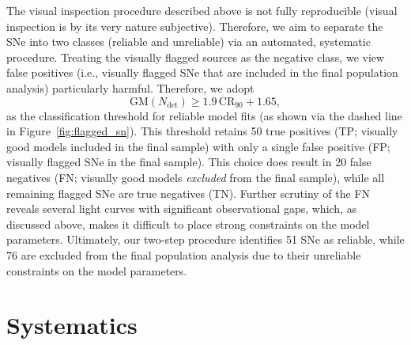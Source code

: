 \documentclass[twocolumn]{./aastex63}
\begin{document}
The visual inspection procedure described above is not fully reproducible
(visual inspection is by its very nature subjective). Therefore, we aim to
separate the SNe into two classes (reliable and unreliable) via an automated,
systematic procedure. Treating the visually flagged sources as the negative
class, we view false positives (i.e., visually flagged SNe that are included
in the final population analysis) particularly harmful. Therefore, we adopt
%
$$ \mathrm{GM}(N_\mathrm{det}) \ge 1.9\,\mathrm{CR}_{90} + 1.65,$$
%
as the classification threshold for reliable model fits (as shown via the
dashed line in Figure~\ref{fig:flagged_sn}). This threshold retains 50 true
positives (TP; visually good models included in the final sample) with only a
single false positive (FP; visually flagged SNe in the final sample). This
choice does result in 20 false negatives (FN; visually good models
\textit{excluded} from the final sample), while all remaining flagged SNe are
true negatives (TN). Further scrutiny of the FN reveals several light curves
with significant observational gaps, which, as discussed above, makes it
difficult to place strong constraints on the model parameters. Ultimately,
our two-step procedure identifies 51 SNe as reliable, while 76 are excluded
from the final population analysis due to their unreliable constraints on the
model parameters.

\section{Systematics}\label{sec:systematics}






\end{document}
